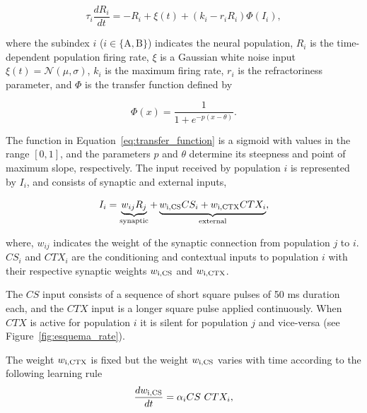 \begin{equation}
    \tau_{i}\frac{dR_{i}}{dt} = -R_{i} + \xi(t) + (k_{i}-r_{i}R_{i})\Phi(I_{i}),
    \label{eq:rate_model}
\end{equation}

\noindent where the subindex $i$ ($i \in \{\text{A},\text{B}\}$) indicates the neural population, $R_{i}$ is the time-dependent population firing rate, $\xi$ is a Gaussian white noise input $\xi(t) = \mathcal{N}(\mu, \sigma)$, $k_i$ is the maximum firing rate, $r_i$ is the refractoriness parameter, and $\Phi$ is the transfer function defined by

\begin{equation}
    \Phi(x) = \frac{1}{1 + e^{-p(x-\theta)}}.
    \label{eq:transfer_function}
\end{equation}

\noindent The function in Equation~\ref{eq:transfer_function} is a sigmoid with values in the range $[0, 1]$, and the parameters $p$ and $\theta$ determine its steepness and point of maximum slope, respectively. 
The input received by population $i$ is represented by $I_i$, and consists of synaptic and external inputs,

\begin{equation}
    I_{i} = \underbrace{w_{ij}R_{j}}_{\text{synaptic}} + \underbrace{w_{\rm i,CS}CS_{i} + w_{\rm i,CTX}CTX_{i}}_{\text{external}},
    \label{eq:inputs}
\end{equation}

\noindent where, $w_{ij}$ indicates the weight of the synaptic connection from population $j$ to $i$. $CS_{i}$ and $CTX_{i}$ are the conditioning and contextual inputs to population $i$ with their respective synaptic weights $w_{\rm i,CS}$ and $w_{\rm i,CTX}$.

The $CS$ input consists of a sequence of short square pulses of 50 ms duration each, and the $CTX$ input is a longer square pulse applied continuously.
When $CTX$ is active for population $i$ it is silent for population $j$ and vice-versa (see Figure~\ref{fig:esquema_rate}).

The weight $w_{\rm i,CTX}$ is fixed but the weight $w_{\rm i,CS}$ varies with time according to the following learning rule
\begin{equation}
    \frac{dw_{\rm i,CS}}{dt} = \alpha_{i}CS\text{ }CTX_{i},
    \label{eq:learning_rate}
\end{equation}

